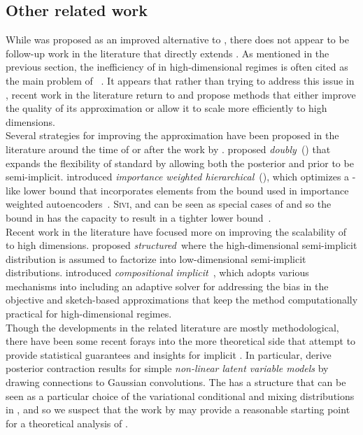 \documentclass[10pt]{article}
\begin{document}
\subsection{Other related work} \label{an:postpaper}

While \uivi was proposed as an improved alternative to \sivi, there does not appear to be follow-up work in the literature that directly extends \uivi. As mentioned in the previous section, the inefficiency of \mcmc in high-dimensional regimes is often cited as the main problem of \uivi~\citep{Molchanova:2019,Moens:2021}. It appears that rather than trying to address this issue in \uivi, recent work in the literature return to \sivi and propose methods that either improve the quality of its approximation or allow it to scale more efficiently to high dimensions.
\\

Several strategies for improving the \sivi approximation have been proposed in the literature around the time of or after the work by \citet{Titsias:2019}. \citet{Molchanov:2019} proposed \textit{doubly}~\sivi (\dsivi) that expands the flexibility of standard \sivi by allowing both the posterior and prior to be semi-implicit. \citet{Sobolev:2019} introduced \textit{importance weighted hierarchical}~\vi (\iwhvi), which optimizes a \sivi-like lower bound that incorporates elements from the bound used in importance weighted autoencoders~\citep{Burda:2015}. \textsc{Sivi}, \dsivi and \hvm can be seen as special cases of \iwhvi and so the bound in \iwhvi has the capacity to result in a tighter lower bound~\citep{Sobolev:2019}.
\\

Recent work in the literature have focused more on improving the scalability of \sivi to high dimensions. \citet{Molchanova:2019} proposed \textit{structured}~\sivi where the high-dimensional semi-implicit distribution is assumed to factorize into low-dimensional semi-implicit distributions. \citet{Moens:2021} introduced \textit{compositional implicit}~\vi, which adopts various mechanisms into \sivi including an adaptive solver for addressing the bias in the objective and sketch-based approximations that keep the method computationally practical for high-dimensional regimes.
\\

Though the developments in the related literature are mostly methodological, there have been some recent forays into the more theoretical side that attempt to provide statistical guarantees and insights for implicit \vi. In particular, \citet{Plummer:2021} derive posterior contraction results for simple \textit{non-linear latent variable models} by drawing connections to Gaussian convolutions. The \nllvm has a structure that can be seen as a particular choice of the variational conditional and mixing distributions in \uivi, and so we suspect that the work by \citet{Plummer:2021} may provide a reasonable starting point for a theoretical analysis of \uivi.
\end{document}
